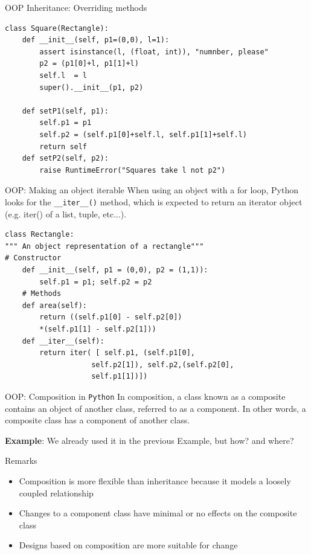 \documentclass[10pt]{beamer}
\begin{document}
\begin{frame}[fragile]{OOP Inheritance: Overriding methods}
\begin{lstlisting}[style=mypython]
class Square(Rectangle):
	def __init__(self, p1=(0,0), l=1):
		assert isinstance(l, (float, int)), "numnber, please"
		p2 = (p1[0]+l, p1[1]+l)
		self.l  = l
		super().__init__(p1, p2)

	def setP1(self, p1):
		self.p1 = p1
		self.p2 = (self.p1[0]+self.l, self.p1[1]+self.l)
		return self
	def setP2(self, p2):
		raise RuntimeError("Squares take l not p2")
\end{lstlisting}
\end{frame}

\begin{frame}[fragile]{OOP: Making an object iterable}
When using an object with a for loop, Python looks for the \texttt{\_\_iter\_\_()} method, which is expected to return an iterator object (e.g. iter() of a list, tuple, etc...).
\begin{lstlisting}[style=mypython]
class Rectangle:
""" An object representation of a rectangle"""
# Constructor
	def __init__(self, p1 = (0,0), p2 = (1,1)):
		self.p1 = p1; self.p2 = p2
	# Methods
	def area(self):
		return ((self.p1[0] - self.p2[0]) 
		*(self.p1[1] - self.p2[1]))
	def __iter__(self):
		return iter( [ self.p1, (self.p1[0],
					self.p2[1]), self.p2,(self.p2[0],
					self.p1[1])])
\end{lstlisting}
\end{frame}


\begin{frame}[fragile]{OOP: Composition in \texttt{Python}}
In composition, a class known as a composite contains an object of another class, referred to as a component. In other words, a composite class has a component of another class.

\textbf{Example}: We already used it in the previous Example, but how? and where?

\begin{block}{Remarks}
\begin{itemize}
	\item Composition is more flexible than inheritance because it models a loosely coupled relationship
	\item Changes to a component class have minimal or no effects on the composite class
	\item Designs based on composition are more suitable for change
\end{itemize}
\end{block}
\end{frame}
\end{document}
